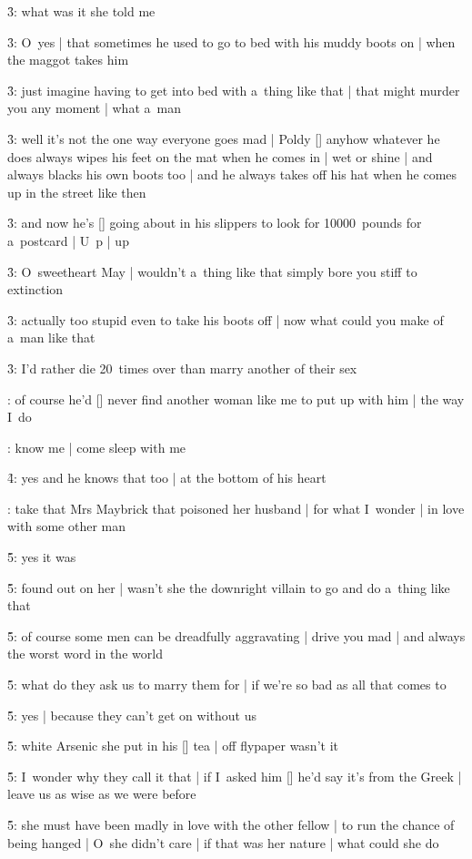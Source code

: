 \f3:
what was it she told me

\f3:
O~yes |
that sometimes he used to go to bed with his muddy boots on |
when the maggot takes him

\f3:
just imagine having to get into bed with a~thing like that |
that might murder you any moment |
what a~man

\f3:
well it's not the one way everyone goes mad |
Poldy [\bloom] anyhow whatever he does
always wipes his feet on the mat when he comes in |
wet or shine |
and always blacks his own boots too |
and he always takes off his hat when he comes up in the street like then

\f3:
and now he's [\breen] going about in his slippers
to look for 10000~pounds for a~postcard |
U~p |
up

\f3:
O~sweetheart May |
wouldn't a~thing like that simply bore you stiff to extinction

\f3:
actually too stupid even to take his boots off |
now what could you make of a~man like that

\f3:
I'd rather die 20~times over than marry another of their sex

:
of course he'd [\bloom] never find another woman like me to put up with him |
the way I~do

:
know me |
come sleep with me

\f4:
yes and he knows that too |
at the bottom of his heart

:
take that Mrs Maybrick that poisoned her husband |
for what I~wonder |
in love with some other man

\f5:
yes it was

\f5:
found out on her |
wasn't she the downright villain to go and do a~thing like that

\f5:
of course some men can be dreadfully aggravating |
drive you mad |
and always the worst word in the world

\f5:
what do they ask us to marry them for |
if we're so bad as all that comes to

\f5:
yes |
because they can't get on without us

\f5:
white Arsenic she put in his [\maybrick] tea |
off flypaper wasn't it

\f5:
I~wonder why they call it that |
if I~asked him [\bloom] he'd say it's from the Greek |
leave us as wise as we were before

\f5:
she must have been madly in love with the other fellow |
to run the chance of being hanged |
O~she didn't care |
if that was her nature |
what could she do

